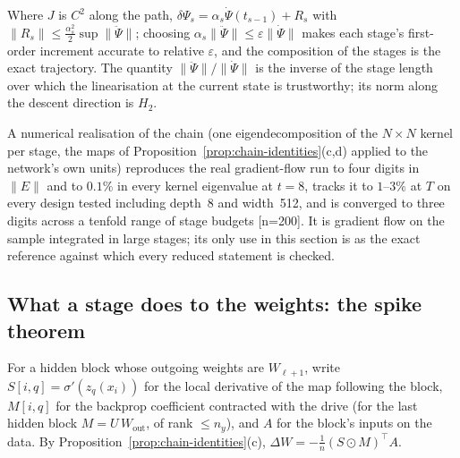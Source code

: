 \begin{theorem}
\label{thm:chain}
Where $J$ is $C^2$ along the path,
$\delta\Psi_s=\alpha_s\dot\Psi(t_{s-1})+R_s$ with
$\|R_s\|\le\frac{\alpha_s^2}2\sup\|\ddot\Psi\|$; choosing
$\alpha_s\|\ddot\Psi\|\le\varepsilon\|\dot\Psi\|$ makes each stage's first-order
increment accurate to relative $\varepsilon$, and the composition of the
stages is the exact trajectory. The quantity $\|\ddot\Psi\|/\|\dot\Psi\|$ is the
inverse of the stage length over which the linearisation at the current state
is trustworthy; its norm along the descent direction is $H_2$.
\end{theorem}
\begin{remark}
A numerical realisation of the chain (one eigendecomposition of the
$N\times N$ kernel per stage, the maps of
Proposition~\ref{prop:chain-identities}(c,d) applied to the network's own
units) reproduces the real gradient-flow run to four digits in $\|E\|$ and to
$0.1\%$ in every kernel eigenvalue at $t=8$, tracks it to $1$--$3\%$ at $T$ on
every design tested including depth~8 and width~512, and is converged to
three digits across a tenfold range of stage budgets [n=200]. It is gradient
flow on the sample integrated in large stages; its only use in this section is
as the exact reference against which every reduced statement is checked.
\end{remark}

\subsection{What a stage does to the weights: the spike theorem}
\label{ssec:chain-spikes}

For a hidden block whose outgoing weights are $W_{\ell+1}$, write
$S[i,q]=\sigma'(z_q(x_i))$ for the local derivative of the map following the
block, $M[i,q]$ for the backprop coefficient contracted with the drive (for the
last hidden block $M=U\,W_{\mathrm{out}}$, of rank $\le n_y$), and $A$ for the
block's inputs on the data. By Proposition~\ref{prop:chain-identities}(c),
$\Delta W=-\frac1n(S\odot M)^{\!\top}A$.

